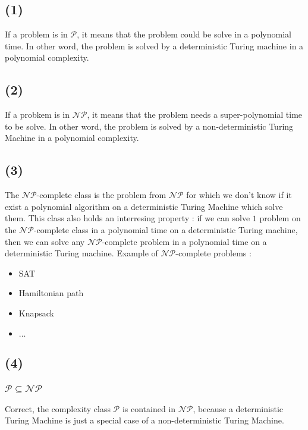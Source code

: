 \documentclass[a4paper,11pt]{report}
\begin{document}
\subsection*{(1)}

If a problem is in $\mathcal{P}$, it means that the problem could be solve in a
polynomial time. In other word, the problem is solved by a deterministic Turing
machine in a polynomial complexity.

\subsection*{(2)}

If a probkem is in $\mathcal{NP}$, it means that the problem needs a
super-polynomial time to be solve. In other word, the problem is solved by a
non-deterministic Turing Machine in a polynomial complexity.

\subsection*{(3)}

The $\mathcal{NP}$-complete class is the problem from $\mathcal{NP}$ for which
we don't know if it exist a polynomial algorithm on a deterministic Turing
Machine which solve them. This class also holds an interresing property : if we
can solve $1$ problem on the $\mathcal{NP}$-complete class in a polynomial time
on a deterministic Turing machine, then we can solve any $\mathcal{NP}$-complete
problem in a polynomial time on a deterministic Turing machine. Example of
$\mathcal{NP}$-complete problems :
\begin{itemize}
\item SAT
\item Hamiltonian path
\item Knapsack
\item $\dots$
\end{itemize}

\subsection*{(4)}

\subsubsection*{$\mathcal{P} \subseteq \mathcal{NP}$}

Correct, the complexity class $\mathcal{P}$ is contained in $\mathcal{NP}$,
because a deterministic Turing Machine is just a special case of a
non-deterministic Turing Machine.
\end{document}
